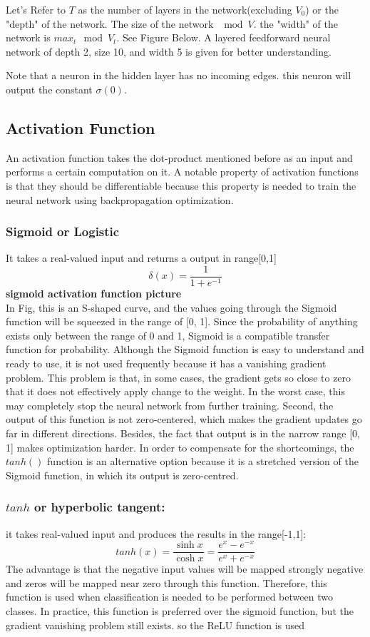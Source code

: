 Let's Refer to $T$ as the number of layers in the network(excluding $V_{0}$) or the "depth" of the network. The size of the network $\mod{V}$. the "width" of the network is $max_{t}\mod{V_{t}}$. See Figure Below. A layered feedforward neural network of depth 2, size 10, and width 5 is given for better understanding.

Note that a neuron in the hidden layer has no incoming edges. this neuron will output the constant $\sigma(0).$

\subsection{Activation Function}
An activation function takes the dot-product mentioned before as an input and performs a certain computation on it.
A notable property of activation functions is that they should
be differentiable because this property is needed to train the neural network using backpropagation optimization.

\subsubsection{Sigmoid or Logistic}It takes a real-valued input and returns a output in range[0,1]
$$\delta(x)=\frac{1}{1+e^{-1}}$$ 
\textbf{sigmoid activation function picture}\\
In Fig, this is an S-shaped curve, and the values going through the Sigmoid function will be squeezed in the range of [0, 1]. Since the probability of anything exists only between the range of 0 and 1, Sigmoid is a compatible transfer function for probability. Although the Sigmoid function is easy to understand and ready to use, it is not used frequently because it has a vanishing gradient problem. This problem is that, in some cases, the gradient gets so close to zero that it does not effectively apply change to the weight. In the worst case, this may completely stop the neural network from further
training. Second, the output of this function is not zero-centered, which makes the gradient updates go far in different directions. Besides, the fact that output is in the narrow range [0, 1] makes optimization harder. In order to compensate for the shortcomings, the $tanh()$ function is an alternative option because it is a stretched version of the Sigmoid function, in which its output is zero-centred.
\subsubsection{$tanh$ or hyperbolic tangent:}
it takes real-valued input and produces the results in the range[-1,1]:
$$tanh(x) = \frac{\sinh{x}}{\cosh{x}}=\frac{e^{x}-e^{-x}}{e^{x}+e^{-x}}$$
The advantage is that the negative input values will be mapped strongly negative and zeros will be mapped near zero through this function. Therefore, this function is used when classification is needed to be performed between two classes. In practice, this function is preferred over the sigmoid function, but the gradient vanishing problem still exists. so the ReLU function is used
